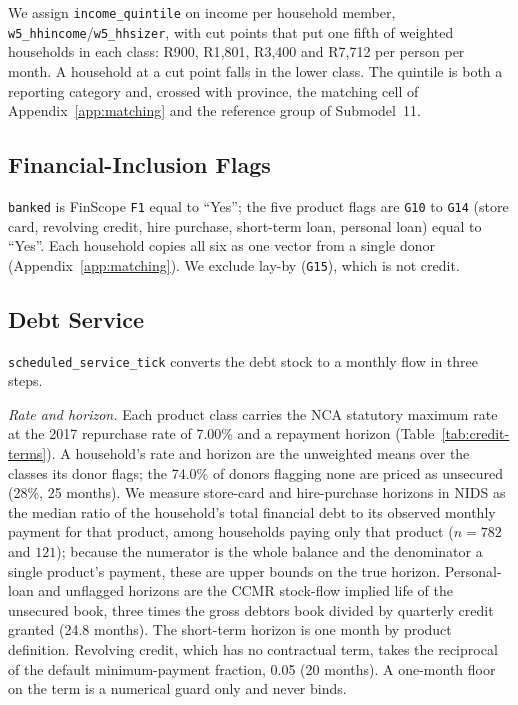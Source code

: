 We assign \texttt{income\_quintile} on income per household member,
\texttt{w5\_hhincome}/\texttt{w5\_hhsizer}, with cut points that put one fifth of weighted
households in each class: R900, R1{,}801, R3{,}400 and R7{,}712 per person per month. A household
at a cut point falls in the lower class. The quintile is both a reporting category and, crossed
with province, the matching cell of Appendix~\ref{app:matching} and the reference group of
Submodel~11.

\subsection{Financial-Inclusion Flags}\label{app:var-flags}

\texttt{banked} is \ac{FinScope} \texttt{F1} equal to ``Yes''; the five product flags are
\texttt{G10} to \texttt{G14} (store card, revolving credit, hire purchase, short-term loan,
personal loan) equal to ``Yes''. Each household copies all six as one vector from a single donor
(Appendix~\ref{app:matching}). We exclude lay-by (\texttt{G15}), which is not credit.

\subsection{Debt Service}
\label{app:var-servicing}

\texttt{scheduled\_service\_tick} converts the debt stock to a monthly flow in three steps.

\emph{Rate and horizon.} Each product class carries the \ac{NCA} statutory maximum rate at the
2017 repurchase rate of 7.00\% and a repayment horizon (Table~\ref{tab:credit-terms}). A
household's rate and horizon are the unweighted means over the classes its donor flags; the
74.0\% of donors flagging none are priced as unsecured (28\%, 25 months). We measure store-card
and hire-purchase horizons in \ac{NIDS} as the median ratio of the household's total
financial debt to its observed monthly payment for that product, among households paying only
that product ($n = 782$ and $121$); because
the numerator is the whole balance and the denominator a single product's payment, these are
upper bounds on the true horizon. Personal-loan and unflagged horizons are the \ac{CCMR}
stock-flow implied life of the unsecured book, three times the gross debtors book divided by
quarterly credit granted (24.8 months). The short-term horizon is one month by product
definition. Revolving credit, which has no contractual term, takes the reciprocal of the
default minimum-payment fraction, 0.05 (20 months). A one-month floor on the term is a numerical
guard only and never binds.

